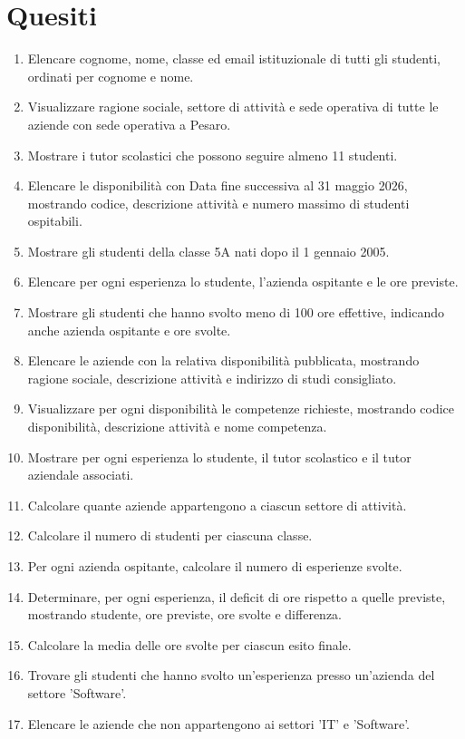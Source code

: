 \documentclass[a4paper,12pt]{article}
\begin{document}
\section*{Quesiti}\begin{enumerate}[leftmargin=0.8cm,label=\textbf{\arabic*.}]
\item Elencare cognome, nome, classe ed email istituzionale di tutti gli studenti, ordinati per cognome e nome.
\item Visualizzare ragione sociale, settore di attività e sede operativa di tutte le aziende con sede operativa a Pesaro.
\item Mostrare i tutor scolastici che possono seguire almeno 11 studenti.
\item Elencare le disponibilità con Data fine successiva al 31 maggio 2026, mostrando codice, descrizione attività e numero massimo di studenti ospitabili.
\item Mostrare gli studenti della classe 5A nati dopo il 1 gennaio 2005.
\item Elencare per ogni esperienza lo studente, l'azienda ospitante e le ore previste.
\item Mostrare gli studenti che hanno svolto meno di 100 ore effettive, indicando anche azienda ospitante e ore svolte.
\item Elencare le aziende con la relativa disponibilità pubblicata, mostrando ragione sociale, descrizione attività e indirizzo di studi consigliato.
\item Visualizzare per ogni disponibilità le competenze richieste, mostrando codice disponibilità, descrizione attività e nome competenza.
\item Mostrare per ogni esperienza lo studente, il tutor scolastico e il tutor aziendale associati.
\item Calcolare quante aziende appartengono a ciascun settore di attività.
\item Calcolare il numero di studenti per ciascuna classe.
\item Per ogni azienda ospitante, calcolare il numero di esperienze svolte.
\item Determinare, per ogni esperienza, il deficit di ore rispetto a quelle previste, mostrando studente, ore previste, ore svolte e differenza.
\item Calcolare la media delle ore svolte per ciascun esito finale.
\item Trovare gli studenti che hanno svolto un'esperienza presso un'azienda del settore 'Software'.
\item Elencare le aziende che non appartengono ai settori 'IT' e 'Software'.

\end{enumerate}
\end{document}
